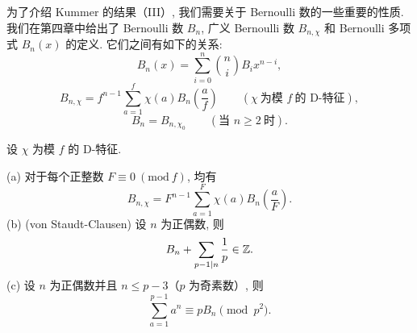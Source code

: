 为了介绍 Kummer 的结果（III）, 我们需要关于 Bernoulli 数的一些重要的性质. 我们在第四章中给出了 Bernoulli 数 $B_n$, 广义 Bernoulli 数 $B_{n,\chi}$ 和 Bernoulli 多项式 $B_n(x)$ 的定义. 它们之间有如下的关系:
\[
  B_n(x)=\sum_{i=0}^{n}\binom{n}{i}B_ix^{n-i},
\]
\[
  B_{n,\chi}=f^{n-1}\sum_{a=1}^{f}\chi(a)B_n\left(\frac{a}{f}\right)\qquad(\chi\ \text{为模 } f\ \text{的 D-特征}),
\]
\[
  B_n=B_{n,\chi_0}\qquad(\text{当 } n\geqslant 2\ \text{时}).
\]

\begin{lemma}\label{lem:ch6-9}
设 $\chi$ 为模 $f$ 的 D-特征.

(a) 对于每个正整数 $F\equiv 0\ (\mathrm{mod}\ f)$, 均有
\[
  B_{n,\chi}=F^{n-1}\sum_{a=1}^{F}\chi(a)B_n\left(\frac{a}{F}\right).
\]
(b) (von Staudt-Clausen) 设 $n$ 为正偶数, 则
\[
  B_n+\sum_{p-1\mid n}\frac{1}{p}\in\mathbb{Z}.
\]
(c) 设 $n$ 为正偶数并且 $n\leqslant p-3$（$p$ 为奇素数）, 则
\[
  \sum_{a=1}^{p-1}a^n\equiv pB_n\pmod{p^2}.
\]
\end{lemma}


